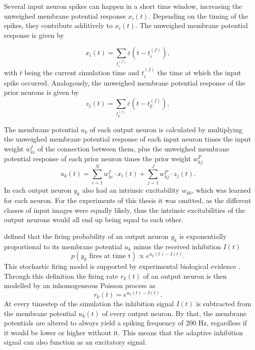 Several input neuron spikes can happen in a short time window, increasing the unweighed membrane potential response $x_i(t)$. Depending on the timing of the spikes, they contribute additively to $x_i(t)$. The unweighed membrane potential response is given by

\begin{equation}
x_i(t) = \sum_{t_i^{(f)}} \varepsilon (t - t_i^{(f)}),
\end{equation}
with $t$ being the current simulation time and $t_i^{(f)}$ the time at which the input spike occurred.
Analogously, the unweighed membrane potential response of the prior neurons is given by
\begin{equation}
z_j(t) = \sum_{t_p^{(f)}} \varepsilon (t - t_p^{(f)}),
\end{equation}
 
The membrane potential $u_k$ of each output neuron is calculated by multiplying the unweighed membrane potential response of each input neuron times the input weight $w^{I}_{ki}$ of the connection between them, plus the unweighed membrane potential response of each prior neuron times the prior weight $w^{P}_{kj}$
\begin{equation}
\label{eqn:uk}
u_k(t) = \sum_{i=1}^N w^{I}_{ki} \cdot x_i(t) + \sum_{j=1}^J w^{P}_{kj} \cdot z_j(t).
\end{equation}
In \citet{nessler} each output neuron $y_k$ also had an intrinsic excitability $w_{k0}$, which was learned for each neuron. For the experiments of this thesis it was omitted, as the different classes of  input images were equally likely, thus the intrinsic excitabilities of the output neurons would all end up being equal to each other.

\citet{nessler} defined that the firing probability of an output neuron  $y_k$ is exponentially proportional to its membrane potential $u_k$ minus the received inhibition $I(t)$
\begin{equation}
\label{eqn:pVonY}
p(y_k \text{ fires at time t}) \propto e^{u_k(t) - I(t)}.
\end{equation}
This stochastic firing model is supported by experimental biological evidence \citep{woDasEHerkommt}. Through this definition the firing rate $r_k(t)$ of an output neuron is then modelled by an inhomogeneous Poisson process as
\begin{equation}
\label{eqn:rk}
r_k(t) = e^{u_k(t) - I(t)}.
\end{equation}
At every timestep of the simulation the inhibition signal $I(t)$ is subtracted from the membrane potential $u_k(t)$ of every output neuron. By that, the membrane potentials are altered to always yield a spiking frequency of 200 Hz, regardless if it would be lower or higher without it. This means that the adaptive inhibition signal can also function as an excitatory signal. 

